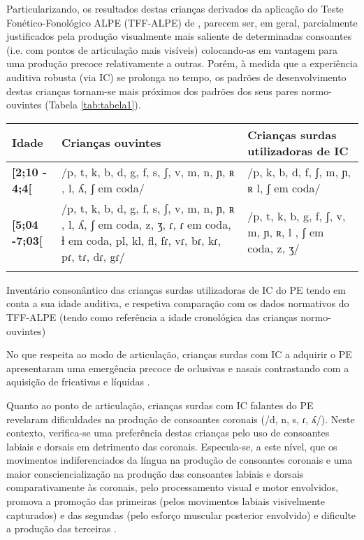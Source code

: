 \documentclass[output=paper,colorlinks,citecolor=brown,booklanguage=portuguese]{langscibook}
\begin{document}
Particularizando, os resultados destas crianças derivados da aplicação do Teste Fonético-Fonológico ALPE (TFF-ALPE) de \citet{Mendes2013}, parecem ser, em geral, parcialmente justificados pela produção visualmente mais saliente de determinadas consoantes (i.e. com pontos de articulação mais visíveis) colocando-as em vantagem para uma produção precoce relativamente a outras. Porém, à medida que a experiência auditiva robusta (via IC) se prolonga no tempo, os padrões de desenvolvimento destas crianças tornam-se mais próximos dos padrões dos seus pares normo-ouvintes (Tabela \ref{tab:tabela1}).


\begin{Tabela}
    \begin{tabularx}{\textwidth}{lQQ}
\lsptoprule
\textbf{Idade}& 	\textbf{Crianças ouvintes}&	\textbf{Crianças surdas}   \textbf{utilizadoras de IC}\\
\midrule

\textbf{[2;10 - 4;4[}   &	/p, t, k, b, d, g, f, s, ʃ, v, m, n, ɲ, ʀ , l, ʎ, ʃ em coda/  &	/p, k, b, d, f, ʃ, m, ɲ, ʀ l, ʃ em coda/\\
\tablevspace
 \textbf{[5;04 -7;03[}  &	/p, t, k, b, d, g, f, s, ʃ, v, m, n, ɲ, ʀ , l, ʎ, ʃ em coda, z, ʒ, ɾ, ɾ em coda, ɫ em coda, pl, kl, fl, fɾ, vɾ, bɾ, kɾ, pɾ, tɾ, dɾ, gɾ/  &	/p, t, k, b, g, f, ʃ, v, m, ɲ, ʀ, l , ʃ em coda, z, ʒ/ \\
\lspbottomrule
    \end{tabularx}
    \caption{{Inventário consonântico das crianças surdas utilizadoras de IC do PE tendo em conta a sua idade auditiva, e respetiva comparação com os dados normativos do TFF-ALPE (tendo como referência a idade cronológica das crianças     normo-ouvintes)}}
    \label{tab:tabela1}


\end{Tabela}

No que respeita ao modo de articulação, crianças surdas com IC a adquirir o PE apresentaram uma emergência precoce de oclusivas e nasais contrastando com a aquisição de fricativas e líquidas \citep{Lynce2019}. 

Quanto ao ponto de articulação, crianças surdas com IC falantes do PE revelaram dificuldades na produção de consoantes coronais (/d, n, s, ɾ, ʎ/). Neste contexto, verifica-se uma preferência destas crianças pelo uso de consoantes labiais e dorsais em detrimento das coronais. Especula-se, a este nível, que os movimentos indiferenciados da língua na produção de consoantes coronais e uma maior consciencialização na produção das consoantes labiais e dorsais comparativamente às coronais, pelo processamento visual e motor envolvidos, promova a promoção das primeiras (pelos movimentos labiais visivelmente capturados) e das segundas (pelo esforço muscular posterior envolvido) e dificulte a produção das terceiras \citep{Lynce2019}.
\end{document}
